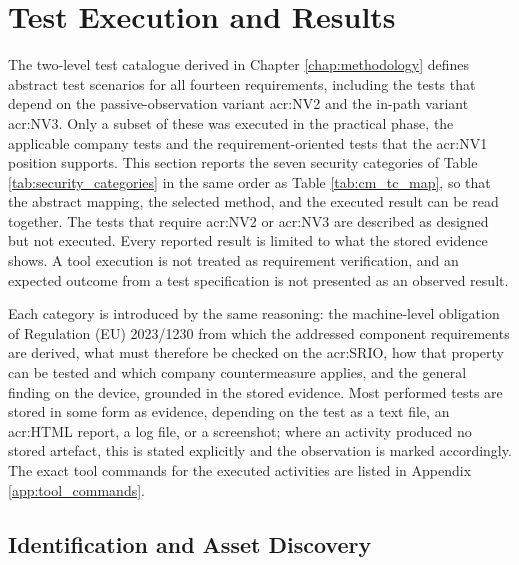 \section{Test Execution and Results}
\label{sec:executed_tests} 
The two-level test catalogue derived in Chapter \ref{chap:methodology} defines abstract test scenarios for all fourteen requirements, including the tests that depend on the passive-observation variant \gls{acr:NV2} and the in-path variant \gls{acr:NV3}. Only a subset of these was executed in the practical phase, the applicable company tests and the requirement-oriented tests that the \gls{acr:NV1} position supports. This section reports the seven security categories of Table \ref{tab:security_categories} in the same order as Table \ref{tab:cm_tc_map}, so that the abstract mapping, the selected method, and the executed result can be read together. The tests that require \gls{acr:NV2} or \gls{acr:NV3} are described as designed but not executed. Every reported result is limited to what the stored evidence shows. A tool execution is not treated as requirement verification, and an expected outcome from a test specification is not presented as an observed result.

Each category is introduced by the same reasoning: the machine-level obligation of Regulation (EU) 2023/1230 from which the addressed component requirements are derived, what must therefore be checked on the \gls{acr:SRIO}, how that property can be tested and which company countermeasure applies, and the general finding on the device, grounded in the stored evidence. Most performed tests are stored in some form as evidence, depending on the test as a text file, an \gls{acr:HTML} report, a log file, or a screenshot; where an activity produced no stored artefact, this is stated explicitly and the observation is marked accordingly. The exact tool commands for the executed activities are listed in Appendix \ref{app:tool_commands}.


\subsection{Identification and Asset Discovery}
\label{subsec:cat_identification}


